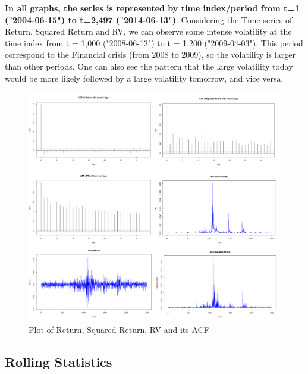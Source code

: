\documentclass[a4paper]{article}
\begin{document}
\textbf{In all graphs, the series is represented by time index/period from t=1 ("2004-06-15") to t=2,497 ("2014-06-13")}.
Considering the Time series of Return, Squared Return and RV, we can observe some intense volatility at the time index from t = 1,000 ("2008-06-13") to t = 1,200 ("2009-04-03"). This period correspond to the Financial crisis (from 2008 to 2009), so the volatility is larger than other periods. One can also see the pattern that the large volatility today would be more likely followed by a large volatility tomorrow, and vice versa.


\begin{figure}[H]
\centering
\includegraphics[width=1.05\textwidth]{AF2.png}
\caption{\label{fig:acf1_plot}Plot of Return, Squared Return, RV and its ACF}
\end{figure}

\subsection{Rolling Statistics}
\end{document}

